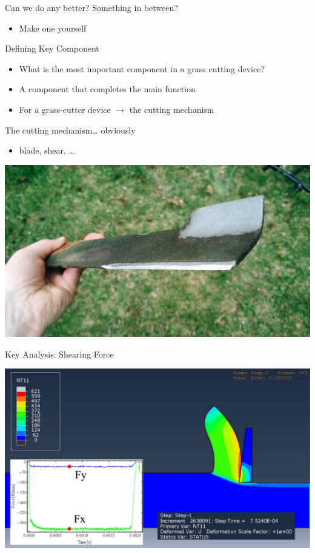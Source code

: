 \documentclass[10pt, svgnames]{beamer}
\begin{document}
\begin{frame}[label={sec:org5b4c89d}]{Can we do any better? Something in between?}
\begin{itemize}
\item Make one yourself
\end{itemize}
\end{frame}


\begin{frame}[label={sec:orgeb5501c}]{Defining Key Component}
\begin{itemize}
\item What is the most important component in a grass cutting device?
\item A component that completes the main function
\item For a grass-cutter device \(\rightarrow\) the cutting mechanism
\end{itemize}
\end{frame}


\begin{frame}[label={sec:org1352485}]{The cutting mechanism\ldots{} obviously}
\begin{itemize}
\item blade, shear, \ldots{}
\end{itemize}

\begin{center}
  \includegraphics[width=.9\linewidth]{./pictures/mower-blade.jpg}
\end{center}
\end{frame}

\begin{frame}[label={sec:orgd2bd6fd}]{Key Analysis: Shearing Force}
\begin{center}
  \includegraphics[width=.9\linewidth]{./pictures/cutting.jpg}
\end{center}
\end{frame}
\end{document}
